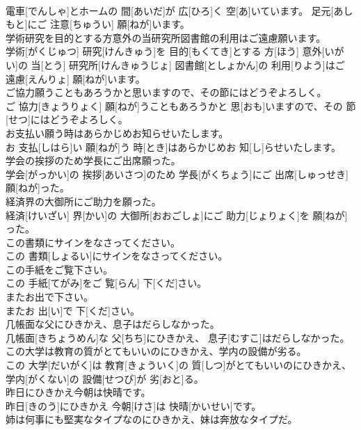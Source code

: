 \documentclass[8pt]{extreport}
\begin{document}
\begin{CJK}{UTF8}{min}
\\	電車[でんしゃ]とホームの 間[あいだ]が 広[ひろ]く 空[あ]いています。 足元[あしもと]にご 注意[ちゅうい] 願[ねが]います。
\\	学術研究を目的とする方意外の当研究所図書館の利用はご遠慮願います。	
\\	学術[がくじゅつ] 研究[けんきゅう]を 目的[もくてき]とする 方[ほう] 意外[いがい]の 当[とう] 研究所[けんきゅうじょ] 図書館[としょかん]の 利用[りよう]はご 遠慮[えんりょ] 願[ねが]います。
\\	ご協力願うこともあろうかと思いますので、その節にはどうぞよろしく。	
\\	ご 協力[きょうりょく] 願[ねが]うこともあろうかと 思[おも]いますので、その 節[せつ]にはどうぞよろしく。
\\	お支払い願う時はあらかじめお知らせいたします。	
\\	お 支払[しはら]い 願[ねが]う 時[とき]はあらかじめお 知[し]らせいたします。
\\	学会の挨拶のため学長にご出席願った。	
\\	学会[がっかい]の 挨拶[あいさつ]のため 学長[がくちょう]にご 出席[しゅっせき] 願[ねが]った。
\\	経済界の大御所にご助力を願った。	
\\	経済[けいざい] 界[かい]の 大御所[おおごしょ]にご 助力[じょりょく]を 願[ねが]った。
\\	この書類にサインをなさってください。	
\\	この 書類[しょるい]にサインをなさってください。
\\	この手紙をご覧下さい。	
\\	この 手紙[てがみ]をご 覧[らん] 下[くだ]さい。
\\	またお出で下さい。	
\\	またお 出[い]で 下[くだ]さい。
\\	几帳面な父にひきかえ、息子はだらしなかった。	
\\	几帳面[きちょうめん]な 父[ちち]にひきかえ、 息子[むすこ]はだらしなかった。
\\	この大学は教育の質がとてもいいのにひきかえ、学内の設備が劣る。	
\\	この 大学[だいがく]は 教育[きょういく]の 質[しつ]がとてもいいのにひきかえ、 学内[がくない]の 設備[せつび]が 劣[おと]る。
\\	昨日にひきかえ今朝は快晴です。	
\\	昨日[きのう]にひきかえ 今朝[けさ]は 快晴[かいせい]です。
\\	姉は何事にも堅実なタイプなのにひきかえ、妹は奔放なタイプだ。	

\end{CJK}
\end{document}
